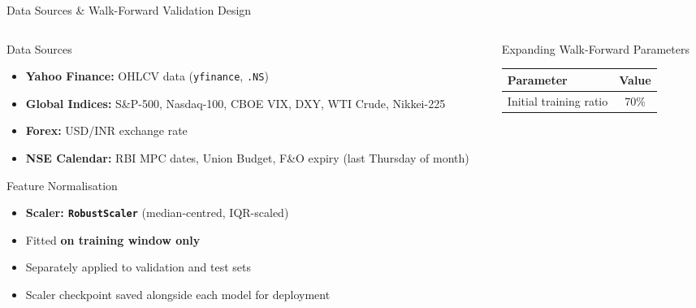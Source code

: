 \documentclass[aspectratio=43,11pt]{beamer}
\begin{document}
\begin{frame}[shrink=10]{Data Sources \& Walk-Forward Validation Design}
    \begin{columns}[T]
        \begin{column}{0.48\textwidth}
            \begin{block}{Data Sources}
                \footnotesize\setlength{\itemsep}{3pt}
                \begin{itemize}
                    \item \textbf{Yahoo Finance:} OHLCV data (\texttt{yfinance}, \texttt{.NS})
                    \item \textbf{Global Indices:} S\&P-500, Nasdaq-100, CBOE VIX, DXY, WTI Crude, Nikkei-225
                    \item \textbf{Forex:} USD/INR exchange rate
                    \item \textbf{NSE Calendar:} RBI MPC dates, Union Budget, F\&O expiry (last Thursday of month)
                \end{itemize}
            \end{block}
            \begin{block}{Feature Normalisation}
                \footnotesize\setlength{\itemsep}{3pt}
                \begin{itemize}
                    \item \textbf{Scaler: \texttt{RobustScaler}} (median-centred, IQR-scaled)
                    \item Fitted \textbf{on training window only}
                    \item Separately applied to validation and test sets
                    \item Scaler checkpoint saved alongside each model for deployment
                \end{itemize}
            \end{block}
        \end{column}
        \begin{column}{0.48\textwidth}
            \begin{block}{Expanding Walk-Forward Parameters}
                \footnotesize
                \begin{center}
                \begin{tabular}{lc}
                    \toprule
                    \textbf{Parameter} & \textbf{Value} \\
                    \midrule
                    Initial training ratio & 70\% \\

\end{tabular}
\end{center}
\end{block}
\end{column}
\end{columns}
\end{frame}
\end{document}
